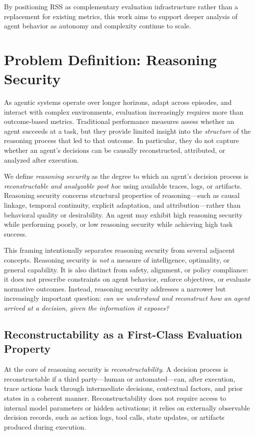 \documentclass[11pt]{article}
\begin{document}
By positioning RSS as complementary evaluation infrastructure rather than a replacement for existing metrics, this work aims to support deeper analysis of agent behavior as autonomy and complexity continue to scale.

\section{Problem Definition: Reasoning Security}
As agentic systems operate over longer horizons, adapt across episodes, and interact with complex environments, evaluation increasingly requires more than outcome-based metrics. Traditional performance measures assess whether an agent succeeds at a task, but they provide limited insight into the \emph{structure} of the reasoning process that led to that outcome. In particular, they do not capture whether an agent’s decisions can be causally reconstructed, attributed, or analyzed after execution.

We define \emph{reasoning security} as the degree to which an agent’s decision process is \emph{reconstructable and analyzable post hoc} using available traces, logs, or artifacts. Reasoning security concerns structural properties of reasoning---such as causal linkage, temporal continuity, explicit adaptation, and attribution---rather than behavioral quality or desirability. An agent may exhibit high reasoning security while performing poorly, or low reasoning security while achieving high task success.

This framing intentionally separates reasoning security from several adjacent concepts. Reasoning security is \emph{not} a measure of intelligence, optimality, or general capability. It is also distinct from safety, alignment, or policy compliance: it does not prescribe constraints on agent behavior, enforce objectives, or evaluate normative outcomes. Instead, reasoning security addresses a narrower but increasingly important question: \emph{can we understand and reconstruct how an agent arrived at a decision, given the information it exposes?}

\subsection{Reconstructability as a First-Class Evaluation Property}
At the core of reasoning security is \emph{reconstructability}. A decision process is reconstructable if a third party---human or automated---can, after execution, trace actions back through intermediate decisions, contextual factors, and prior states in a coherent manner. Reconstructability does not require access to internal model parameters or hidden activations; it relies on externally observable decision records, such as action logs, tool calls, state updates, or artifacts produced during execution.
\end{document}
